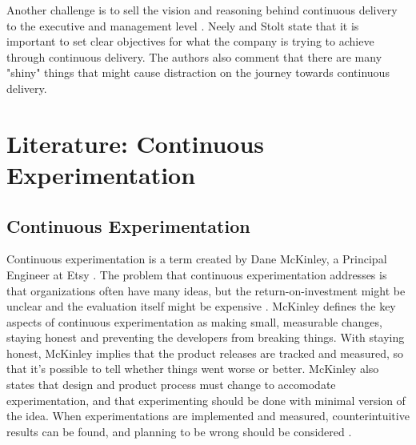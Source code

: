 \documentclass[english]{tktltiki2}
\theoremstyle{definition}
\theoremstyle{remark}
\begin{document}
Another challenge is to sell the vision and reasoning behind continuous delivery to the executive and management level \cite{neely2013continuous}. Neely and Stolt state that it is important to set clear objectives for what the company is trying to achieve through continuous delivery. The authors also comment that there are many "shiny" things that might cause distraction on the journey towards continuous delivery. 



\section{Literature: Continuous Experimentation}

\subsection{Continuous Experimentation}

Continuous experimentation is a term created by Dane McKinley, a Principal Engineer at Etsy \cite{mcfunley}. The problem that continuous experimentation addresses is that organizations often have many ideas, but the return-on-investment might be unclear and the evaluation itself might be expensive \cite{kohavi2007practical}. McKinley defines the key aspects of continuous experimentation as making small, measurable changes, staying honest and preventing the developers from breaking things. With staying honest, McKinley implies that the product releases are tracked and measured, so that it's possible to tell whether things went worse or better. McKinley also states that design and product process must change to accomodate experimentation, and that experimenting should be done with minimal version of the idea. When experimentations are implemented and measured, counterintuitive results can be found, and planning to be wrong should be considered \cite{mcfunley}. 
\end{document}
